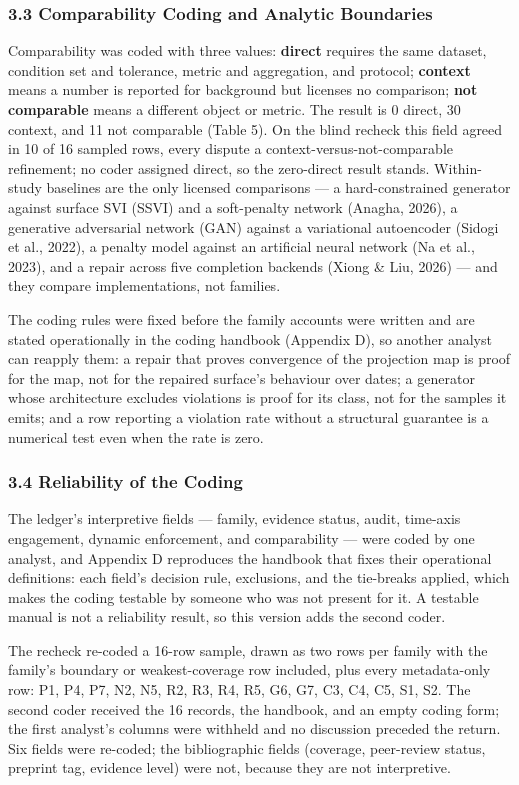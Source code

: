 \documentclass[11pt]{article}
\begin{document}
\subsubsection*{3.3 Comparability Coding and Analytic Boundaries}
Comparability was coded with three values: \textbf{direct} requires the same dataset, condition set and tolerance, metric and aggregation, and protocol; \textbf{context} means a number is reported for background but licenses no comparison; \textbf{not comparable} means a different object or metric. The result is 0 direct, 30 context, and 11 not comparable (Table 5). On the blind recheck this field agreed in 10 of 16 sampled rows, every dispute a context-versus-not-comparable refinement; no coder assigned direct, so the zero-direct result stands. Within-study baselines are the only licensed comparisons — a hard-constrained generator against surface SVI (SSVI) and a soft-penalty network (Anagha, 2026), a generative adversarial network (GAN) against a variational autoencoder (Sidogi et al., 2022), a penalty model against an artificial neural network (Na et al., 2023), and a repair across five completion backends (Xiong \& Liu, 2026) — and they compare implementations, not families.

The coding rules were fixed before the family accounts were written and are stated operationally in the coding handbook (Appendix D), so another analyst can reapply them: a repair that proves convergence of the projection map is proof for the map, not for the repaired surface's behaviour over dates; a generator whose architecture excludes violations is proof for its class, not for the samples it emits; and a row reporting a violation rate without a structural guarantee is a numerical test even when the rate is zero.

\subsubsection*{3.4 Reliability of the Coding}
The ledger's interpretive fields — family, evidence status, audit, time-axis engagement, dynamic enforcement, and comparability — were coded by one analyst, and Appendix D reproduces the handbook that fixes their operational definitions: each field's decision rule, exclusions, and the tie-breaks applied, which makes the coding testable by someone who was not present for it. A testable manual is not a reliability result, so this version adds the second coder.

The recheck re-coded a 16-row sample, drawn as two rows per family with the family's boundary or weakest-coverage row included, plus every metadata-only row: P1, P4, P7, N2, N5, R2, R3, R4, R5, G6, G7, C3, C4, C5, S1, S2. The second coder received the 16 records, the handbook, and an empty coding form; the first analyst's columns were withheld and no discussion preceded the return. Six fields were re-coded; the bibliographic fields (coverage, peer-review status, preprint tag, evidence level) were not, because they are not interpretive.
\end{document}
